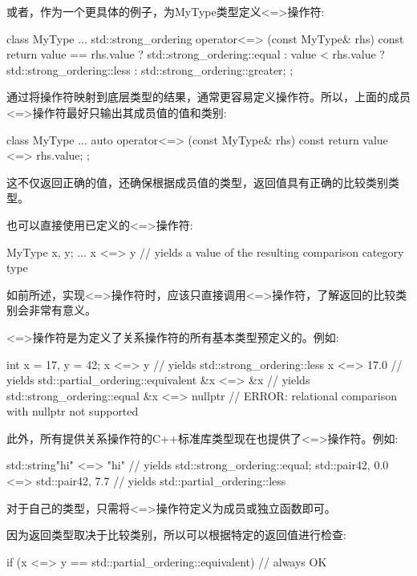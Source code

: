 或者，作为一个更具体的例子，为MyType类型定义<=>操作符:

\begin{cpp}
class MyType {
	...
	std::strong_ordering operator<=> (const MyType& rhs) const {
		return value == rhs.value ? std::strong_ordering::equal :
			   value < rhs.value ? std::strong_ordering::less :
							       std::strong_ordering::greater;
	}
};
\end{cpp}

通过将操作符映射到底层类型的结果，通常更容易定义操作符。所以，上面的成员<=>操作符最好只输出其成员值的值和类别:

\begin{cpp}
class MyType {
	...
	auto operator<=> (const MyType& rhs) const {
		return value <=> rhs.value;
	}
};
\end{cpp}

这不仅返回正确的值，还确保根据成员值的类型，返回值具有正确的比较类别类型。


也可以直接使用已定义的<=>操作符:

\begin{cpp}
MyType x, y;
...
x <=> y // yields a value of the resulting comparison category type
\end{cpp}

如前所述，实现<=>操作符时，应该只直接调用<=>操作符，了解返回的比较类别会非常有意义。

<=>操作符是为定义了关系操作符的所有基本类型预定义的。例如:

\begin{cpp}
int x = 17, y = 42;
x <=> y // yields std::strong_ordering::less
x <=> 17.0 // yields std::partial_ordering::equivalent
&x <=> &x // yields std::strong_ordering::equal
&x <=> nullptr // ERROR: relational comparison with nullptr not supported
\end{cpp}

此外，所有提供关系操作符的C++标准库类型现在也提供了<=>操作符。例如:

\begin{cpp}
std::string{"hi"} <=> "hi" // yields std::strong_ordering::equal;
std::pair{42, 0.0} <=> std::pair{42, 7.7} // yields std::partial_ordering::less
\end{cpp}

对于自己的类型，只需将<=>操作符定义为成员或独立函数即可。

因为返回类型取决于比较类别，所以可以根据特定的返回值进行检查:

\begin{cpp}
if (x <=> y == std::partial_ordering::equivalent) // always OK
\end{cpp}

